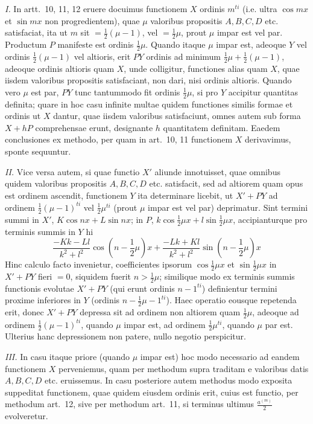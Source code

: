 \documentclass[12pt,a4paper]{article}
\theoremstyle{plain}
\begin{document}
\textit{I.} In artt.\ 10, 11, 12 eruere docuimus functionem $X$ ordinis $m^{ti}$ (i.e. ultra $\cos mx$ et $\sin mx$ non progredientem), quae $\mu$ valoribus propositis
$A, B, C, D$ etc. satisfaciat, ita ut $m$ sit $=\frac{1}{2}(\mu-1)$, vel $=\frac{1}{2}\mu$, prout
$\mu$ impar est vel par. Productum $P$ manifeste est ordinis $\frac{1}{2}\mu$. Quando itaque
$\mu$ impar est, adeoque $Y$ vel ordinis $\frac{1}{2}(\mu-1)$ vel altioris, erit $PY$ ordinis ad minimum $\frac{1}{2}\mu + \frac{1}{2}(\mu-1)$, adeoque ordinis altioris quam $X$, unde colligitur,
functiones alias quam $X$, quae iisdem valoribus propositis satisfaciant, non dari, nisi ordinis altioris. Quando vero $\mu$ est par, $PY$ tunc tantummodo fit ordinis
$\frac{1}{2}\mu$, si pro $Y$ accipitur quantitas definita; quare in hoc casu infinite multae quidem functiones similis formae et ordinis ut $X$ dantur, quae iisdem valoribus
satisfaciunt, omnes autem sub forma $X + hP$ comprehensae erunt, designante $h$ quantitatem definitam. Eaedem conclusiones ex methodo, per quam in art.\ 10, 11
functionem $X$ derivavimus, sponte sequuntur.

\textit{II.} Vice versa autem, si quae functio $X'$ aliunde innotuisset, quae omnibus quidem valoribus propositis $A, B, C, D$ etc. satisfacit, sed ad altiorem quam opus
est ordinem ascendit, functionem $Y$ ita determinare licebit, ut $X' + PY$ ad ordinem
$\frac{1}{2}(\mu-1)^{ti}$ vel $\frac{1}{2}\mu^{ti}$ (prout $\mu$ impar est vel par) deprimatur. Sint termini summi in $X'$, $K\cos nx + L\sin nx$; in $P$, $k\cos\frac{1}{2}\mu x + l\sin\frac{1}{2}\mu x$,
accipianturque pro terminis summis in $Y$ hi
\[
\frac{-Kk - Ll}{k^2 + l^2}\cos\left(n-\frac{1}{2}\mu\right)x + \frac{-Lk + Kl}{k^2 + l^2}\sin\left(n-\frac{1}{2}\mu\right)x
\]
Hinc calculo facto invenietur, coefficientes ipsorum $\cos\frac{1}{2}\mu x$ et $\sin\frac{1}{2}\mu x$ in $X' + PY$ fieri $=0$, siquidem fuerit $n > \frac{1}{2}\mu$; similique modo ex terminis
summis functionis evolutae $X' + PY$ (qui erunt ordinis $n-1^{ti}$) definientur termini proxime inferiores in $Y$ (ordinis $n-\frac{1}{2}\mu - 1^{ti}$). Haec operatio eousque
repetenda erit, donec $X' + PY$ depressa sit ad ordinem non altiorem quam
$\frac{1}{2}\mu$, adeoque ad ordinem $\frac{1}{2}(\mu-1)^{ti}$, quando $\mu$ impar est, ad ordinem
$\frac{1}{2}\mu^{ti}$, quando $\mu$ par est. Ulterius hanc depressionem non patere, nullo negotio perspicitur.

\textit{III.} In casu itaque priore (quando $\mu$ impar est) hoc modo necessario ad eandem functionem $X$ perveniemus, quam per methodum supra traditam e valoribus datis
$A, B, C, D$ etc. eruissemus. In casu posteriore autem methodus modo exposita suppeditat functionem, quae quidem eiusdem ordinis erit, cuius est functio, per
methodum art.\ 12, sive per methodum art.\ 11, si terminus ultimus $\frac{a^{(m)}}{2}$ evolveretur.
\end{document}
